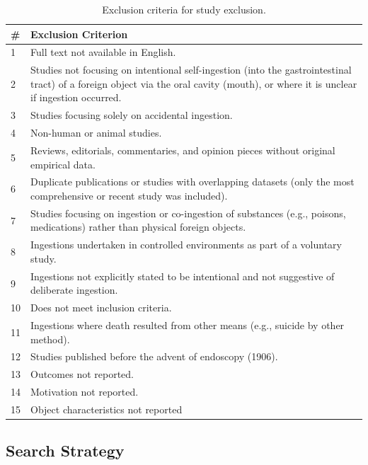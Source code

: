 \begin{table}[H]
\caption{Exclusion criteria for study exclusion.}
\label{tab:exclusion-criteria}
\centering
\begin{tabular}{p{1cm} p{14cm}}
\toprule
\textbf{\#} & \textbf{Exclusion Criterion} \\
\midrule

1 & Full text not available in English. \\
2 & Studies not focusing on intentional self-ingestion (into the gastrointestinal tract) of a foreign object via the oral cavity (mouth), or where it is unclear if ingestion occurred. \\
3 & Studies focusing solely on accidental ingestion. \\
4 & Non-human or animal studies. \\
5 & Reviews, editorials, commentaries, and opinion pieces without original empirical data. \\
6 & Duplicate publications or studies with overlapping datasets (only the most comprehensive or recent study was included). \\
7 & Studies focusing on ingestion or co-ingestion of substances (e.g., poisons, medications) rather than physical foreign objects. \\
8 & Ingestions undertaken in controlled environments as part of a voluntary study. \\
9 & Ingestions not explicitly stated to be intentional and not suggestive of deliberate ingestion. \\
10 & Does not meet inclusion criteria. \\
11 & Ingestions where death resulted from other means (e.g., suicide by other method). \\
12 & Studies published before the advent of endoscopy (1906). \\
13 & Outcomes not reported. \\
14 & Motivation not reported. \\
15 & Object characteristics not reported\\
\bottomrule
\end{tabular}
\end{table}

\clearpage

\subsection{Search Strategy}
\label{appendix:search-strategy}

